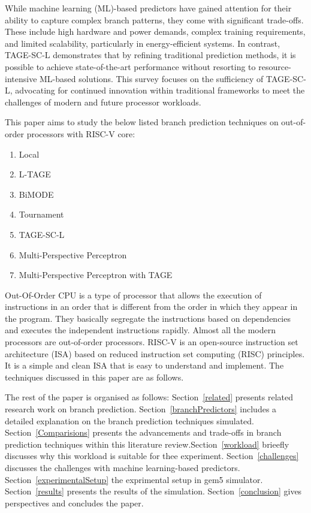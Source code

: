 \documentclass[10pt,journal,compsoc]{IEEEtran}
\begin{document}
    While machine learning (ML)-based predictors have gained attention for their ability to capture complex branch patterns, they come with significant trade-offs. These include high hardware and power demands, complex training requirements, and limited scalability, particularly in energy-efficient systems. In contrast, TAGE-SC-L demonstrates that by refining traditional prediction methods, it is possible to achieve state-of-the-art performance without resorting to resource-intensive ML-based solutions. This survey focuses on the sufficiency of TAGE-SC-L, advocating for continued innovation within traditional frameworks to meet the challenges of modern and future processor workloads.
    
    
This paper aims to study the below listed branch prediction techniques on out-of-order processors with RISC-V core:
\begin{enumerate}
    \item Local
    \item L-TAGE
    \item BiMODE
    \item Tournament
    \item TAGE-SC-L
    \item Multi-Perspective Perceptron
    \item Multi-Perspective Perceptron with TAGE
\end{enumerate}
Out-Of-Order CPU is a type of processor that allows the execution of instructions in an order that is different from the order in which they appear in the program.
They basically segregate the instructions based on dependencies and executes the independent instructions rapidly. Almost all the modern processors are out-of-order processors.
RISC-V is an open-source instruction set architecture (ISA) based on reduced instruction set computing (RISC) principles. It is a simple and clean ISA that is easy to understand and implement.
The techniques discussed in this paper are as follows.


The rest of the paper is organised as follows: Section~\ref{related} presents related research work on branch prediction. Section~\ref{branchPredictors} includes a detailed explanation on the branch prediction techniques simulated. 
Section~\ref{Comparisions} presents the advancements and trade-offs in branch prediction techniques within this literature review.Section~\ref{workload} brieefly discusses why this workload is suitable for thee experiment.
Section~\ref{challenges} discusses the challenges with machine learning-based predictors.
Section~\ref{experimentalSetup} the exprimental setup in gem5 simulator. Section~\ref{results} presents the results of the simulation. Section~\ref{conclusion} gives perspectives and concludes the paper. 
\end{document}
